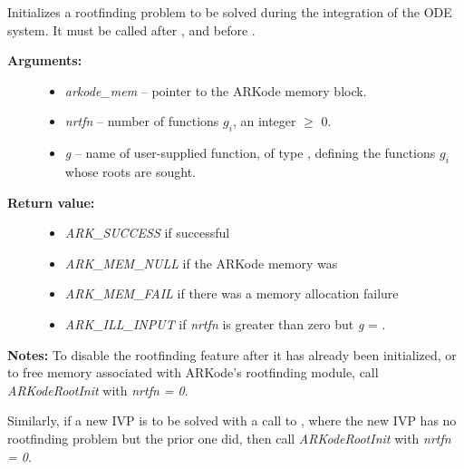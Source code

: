 \documentclass[letterpaper,10pt,english]{sphinxmanual}
\begin{document}
\begin{fulllineitems}
\label{c_interface/User_callable:ARKodeRootInit}
Initializes a rootfinding problem to be solved during the
integration of the ODE system.  It must be called after
{\hyperref[c_interface/User_callable:ARKodeCreate]{}}, and before {\hyperref[c_interface/User_callable:ARKode]{}}.
\begin{description}
\item[{\textbf{Arguments:}}] \leavevmode\begin{itemize}
\item {} 
\emph{arkode\_mem} -- pointer to the ARKode memory block.

\item {} 
\emph{nrtfn} -- number of functions $g_i$, an integer $\ge$ 0.

\item {} 
\emph{g} -- name of user-supplied function, of type {\hyperref[c_interface/User_supplied:ARKRootFn]{}},
defining the functions $g_i$ whose roots are sought.

\end{itemize}

\item[{\textbf{Return value:}}] \leavevmode\begin{itemize}
\item {} 
\emph{ARK\_SUCCESS} if successful

\item {} 
\emph{ARK\_MEM\_NULL}  if the ARKode memory was 

\item {} 
\emph{ARK\_MEM\_FAIL}  if there was a memory allocation failure

\item {} 
\emph{ARK\_ILL\_INPUT} if \emph{nrtfn} is greater than zero but \emph{g} = .

\end{itemize}

\end{description}

\textbf{Notes:} To disable the rootfinding feature after it has already
been initialized, or to free memory associated with ARKode's
rootfinding module, call \emph{ARKodeRootInit} with \emph{nrtfn = 0}.

Similarly, if a new IVP is to be solved with a call to
{\hyperref[c_interface/User_callable:ARKodeReInit]{}}, where the new IVP has no rootfinding
problem but the prior one did, then call \emph{ARKodeRootInit} with
\emph{nrtfn = 0}.

\end{fulllineitems}
\end{document}
